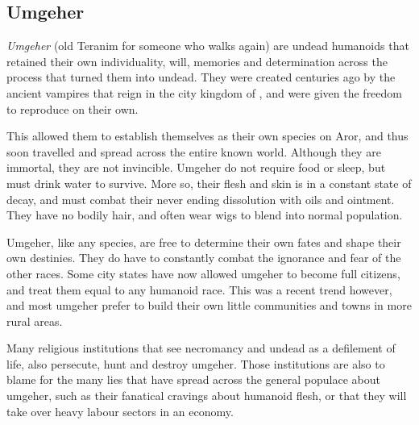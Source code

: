 \subsection{Umgeher}
\label{sec:Umgeher}



\emph{Umgeher} (old Teranim for someone who walks again) are undead humanoids
that retained their own individuality, will, memories and determination across
the process that turned them into undead. They were created centuries ago by
the ancient vampires that reign in the city kingdom of ,
and were given the freedom to reproduce on their own.

This allowed them to establish themselves as their own species on Aror, and
thus soon travelled and spread across the entire known world. Although they
are immortal, they are not invincible. Umgeher do not require food or sleep,
but must drink water to survive. More so, their flesh and skin is in a
constant state of decay, and must combat their never ending dissolution with
oils and ointment. They have no bodily hair, and often wear wigs to blend into
normal population.

Umgeher, like any species, are free to determine their own fates and shape
their own destinies. They do have to constantly combat the ignorance and fear
of the other races. Some city states have now allowed umgeher to become full
citizens, and treat them equal to any humanoid race. This was a recent trend
however, and most umgeher prefer to build their own little communities and
towns in more rural areas.

Many religious institutions that see necromancy and undead as a defilement of
life, also persecute, hunt and destroy umgeher. Those institutions are also
to blame for the many lies that have spread across the general populace about
umgeher, such as their fanatical cravings about humanoid flesh, or that they
will take over heavy labour sectors in an economy.

